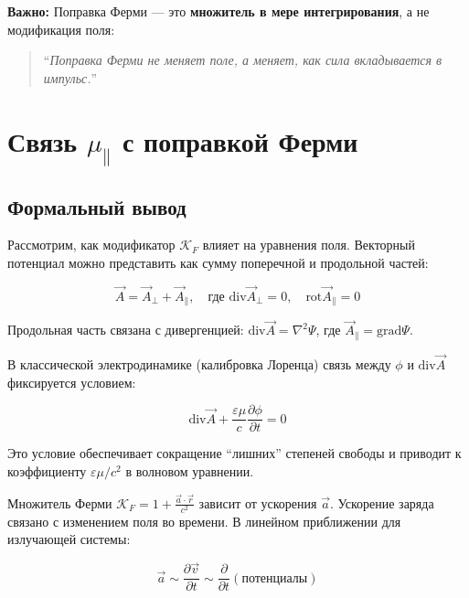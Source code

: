 \documentclass[12pt, a4paper]{article}
\begin{document}
\textbf{Важно:} Поправка Ферми --- это \textbf{множитель в мере интегрирования}, а не модификация поля:

\begin{quote}
``\textit{Поправка Ферми не меняет поле, а меняет, как сила вкладывается в импульс.}'' \cite{FermiSolution}
\end{quote}

\section{Связь $\mu_{\parallel}$ с поправкой Ферми}

\subsection{Формальный вывод}

Рассмотрим, как модификатор $\mathcal{K}_F$ влияет на уравнения поля. Векторный потенциал можно представить как сумму поперечной и продольной частей:

\begin{equation}
\vec{A} = \vec{A}_{\perp} + \vec{A}_{\parallel}, \quad \text{где } \text{div} \vec{A}_{\perp} = 0, \quad \text{rot} \vec{A}_{\parallel} = 0
\label{eq:potential_decomposition}
\end{equation}

Продольная часть связана с дивергенцией: $\text{div} \vec{A} = \nabla^2 \Psi$, где $\vec{A}_{\parallel} = \text{grad} \Psi$.

В классической электродинамике (калибровка Лоренца) связь между $\phi$ и $\text{div} \vec{A}$ фиксируется условием:

\begin{equation}
\text{div} \vec{A} + \frac{\varepsilon \mu}{c} \frac{\partial \phi}{\partial t} = 0
\label{eq:lorentz_condition}
\end{equation}

Это условие обеспечивает сокращение ``лишних'' степеней свободы и приводит к коэффициенту $\varepsilon \mu / c^2$ в волновом уравнении.

Множитель Ферми $\mathcal{K}_F = 1 + \frac{\vec{a} \cdot \vec{r}}{c^2}$ зависит от ускорения $\vec{a}$. Ускорение заряда связано с изменением поля во времени. В линейном приближении для излучающей системы:

\begin{equation}
\vec{a} \sim \frac{\partial \vec{v}}{\partial t} \sim \frac{\partial}{\partial t} (\text{потенциалы})
\label{eq:acceleration_potentials}
\end{equation}
\end{document}
